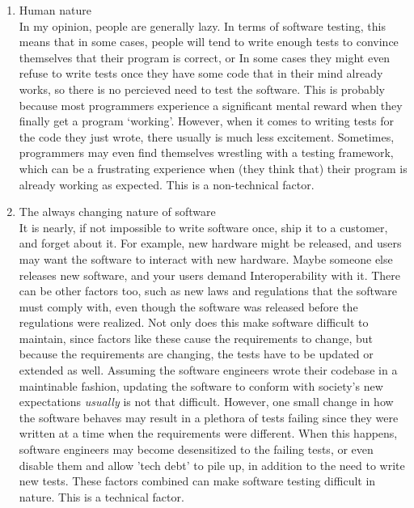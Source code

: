 \documentclass[letterpaper]{article}
\begin{document}
\begin{enumerate}
	\item Human nature\\
	      In my opinion, people are generally lazy. In terms of software testing, this means that in some cases,
	      people will tend to write enough tests to convince themselves that their program is correct, or
	      In some cases they might even refuse to write tests once they have some code that in their mind already works,
	      so there is no percieved need to test the software.
	      This is probably because most programmers experience a significant mental reward when they finally get a program `working'.
	      However, when it comes to writing tests for the code they just wrote, there usually is much less excitement.
	      Sometimes, programmers may even find themselves wrestling with a testing framework, which can be a frustrating experience when (they think that)
	      their program is already working as expected. This is a non-technical factor.

	\item The always changing nature of software\\
	      It is nearly, if not impossible to write software once, ship it to a customer, and forget about it.
	      For example, new hardware might be released, and users may want the software to interact with new hardware.
	      Maybe someone else releases new software, and your users demand Interoperability with it.
	      There can be other factors too, such as new laws and regulations that the software must comply with,
	      even though the software was released before the regulations were realized. Not only does this make
	      software difficult to maintain, since factors like these cause the requirements to change, but because the
	      requirements are changing, the tests have to be updated or extended as well.
	      Assuming the software engineers wrote their codebase in a maintinable fashion, updating the software
	      to conform with society's new expectations \textit{usually} is not that difficult. However, one small change
	      in how the software behaves may result in a plethora of tests failing since they were written at a time
	      when the requirements were different.
	      When this happens, software engineers may become desensitized to the failing tests, or even disable them
	      and allow 'tech debt' to pile up, in addition to the need to write new tests. These factors combined can make
	      software testing difficult in nature. This is a technical factor.
\end{enumerate}
\end{document}
